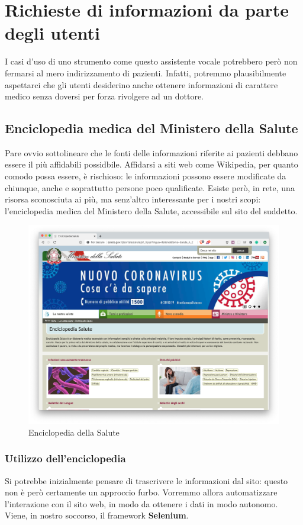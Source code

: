 \chapter{Richieste di informazioni da parte degli utenti}
\label{chap:informations}
I casi d'uso di uno strumento come questo assistente vocale potrebbero però non fermarsi al mero indirizzamento di pazienti. Infatti, potremmo plausibilmente aspettarci che gli utenti desiderino anche ottenere informazioni di carattere medico senza doversi per forza rivolgere ad un dottore.
\section{Enciclopedia medica del Ministero della Salute}
Pare ovvio sottolineare che le fonti delle informazioni riferite ai pazienti debbano essere il più affidabili possidbile. Affidarsi a siti web come Wikipedia, per quanto comodo possa essere, è rischioso: le informazioni possono essere modificate da chiunque, anche e soprattutto persone poco qualificate.
Esiste però, in rete, una risorsa sconosciuta ai più, ma senz'altro interessante per i nostri scopi: l'enciclopedia medica del Ministero della Salute, accessibile sul sito del suddetto.
\begin{figure}[H]
    \begin{center}
        \includegraphics[width=0.8\columnwidth]{images/informations/MinSalute.png}
    \end{center}
    \caption{Enciclopedia della Salute}
    \label{fig:min-salute}
\end{figure}
\subsection{Utilizzo dell'enciclopedia}
Si potrebbe inizialmente pensare di trascrivere le informazioni dal sito: questo non è però certamente un approccio furbo. Vorremmo allora automatizzare l'interazione con il sito web, in modo da ottenere i dati in modo autonomo. Viene, in nostro soccorso, il framework \textbf{Selenium}.
